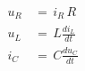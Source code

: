 \documentclass[12pt]{article}
\begin{document}
\sicpsize

\begin{align*}
u_R \, &= \, i_R \, R\\
u_L \, &= \, L \frac{di_L}{dt}\\
i_C \, &= \, C \frac{du_C}{dt}
\end{align*}
\end{document}
